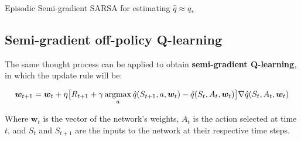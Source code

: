 \begin{algorithm}[H]
\DontPrintSemicolon
\SetAlgoVlined
{}

\caption{Episodic Semi-gradient SARSA for estimating $\hat{q} \approx q_*$}
\end{algorithm}

\subsection{Semi-gradient off-policy Q-learning}
The same thought process can be applied to obtain \textbf{semi-gradient Q-learning}, in which the update rule will be:

\begin{equation}
    \boldsymbol{w}_{t+1} = \boldsymbol{w}_t + \eta \big[ R_{t+1} + \gamma \operatorname*{argmax}_a  \hat{q}(S_{t+1},a,\boldsymbol{w}_t) - \hat{q}(S_t,A_t,\boldsymbol{w}_t) \big] \nabla \hat{q}(S_t,A_t,\boldsymbol{w}_t)
    \label{eq:ch7-qlearningqvaluefunctionapproxssdweightupdate}
\end{equation}

Where $\boldsymbol{w}_t$ is the vector of the network’s weights, $A_t$ is the action selected at time $t$, and $S_t$ and $S_{t+1}$ are the inputs to the network at their respective time steps.

